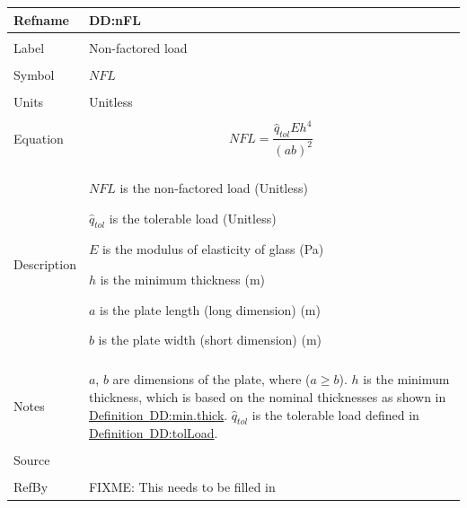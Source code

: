 \documentclass[12pt]{article}
\begin{document}
\noindent \begin{minipage}{\textwidth}
\begin{tabular}{p{} p{}}
\toprule \textbf{Refname} & \textbf{DD:nFL}
\label{DD:nFL}
\\ \midrule \\
Label & Non-factored load
\\ \midrule \\
Symbol & $NFL$
\\ \midrule \\
Units & Unitless
\\ \midrule \\
Equation & \begin{dmath}
           NFL=\frac{{\hat{q}_{tol}} E h^{4}}{\left(a b\right)^{2}}
           \end{dmath}
\\ \midrule \\
Description & \begin{symbDescription}
              \item{$NFL$ is the non-factored load (Unitless)}
              \item{${\hat{q}_{tol}}$ is the tolerable load (Unitless)}
              \item{$E$ is the modulus of elasticity of glass (Pa)}
              \item{$h$ is the minimum thickness (m)}
              \item{$a$ is the plate length (long dimension) (m)}
              \item{$b$ is the plate width (short dimension) (m)}
              \end{symbDescription}
\\ \midrule \\
Notes & $a$, $b$ are dimensions of the plate, where ($a\geq{}b$).
        $h$ is the minimum thickness, which is based on the nominal thicknesses as shown in \hyperref[DD:min.thick]{Definition~DD:min.thick}.
        ${\hat{q}_{tol}}$ is the tolerable load defined in \hyperref[DD:tolLoad]{Definition~DD:tolLoad}.
\\ \midrule \\
Source & 
\\ \midrule \\
RefBy & FIXME: This needs to be filled in
\\ \bottomrule \end{tabular}
\end{minipage}\\
\end{document}
